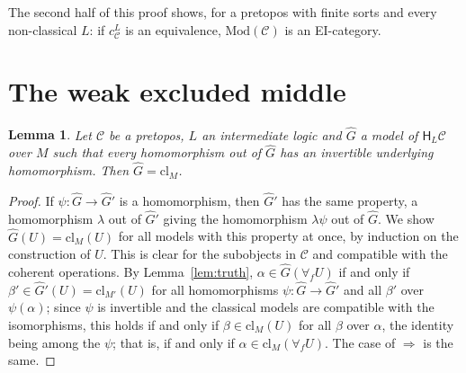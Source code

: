 \documentclass[11pt]{amsart}
\newtheorem{lem}[thm]{Lemma}
\theoremstyle{definition}
\newcommand{\Mod}{\mathrm{Mod}}
\newcommand{\HH}{\mathsf H}
\newcommand{\cC}{\mathcal C}
\newcommand{\cl}{\mathrm{cl}}
\begin{document}
The second half of this proof shows, for a pretopos with finite sorts
and every non-classical $L$: if $c^L_\cC$ is an equivalence,
$\Mod(\cC)$ is an EI-category.

\section{The weak excluded middle}

\begin{lem}\label{lem:classical}
Let $\cC$ be a pretopos, $L$ an intermediate logic and $\hat G$ a
model of $\HH_L\cC$ over $M$ such that every homomorphism out of
$\hat G$ has an invertible underlying homomorphism. Then $\hat G=
\cl_M$.
\end{lem}
\begin{proof}
If $\psi\colon\hat G\to\hat G'$ is a homomorphism, then $\hat G'$ has
the same property, a homomorphism $\lambda$ out of $\hat G'$ giving
the homomorphism $\lambda\psi$ out of $\hat G$. We show $\hat G(U)=
\cl_M(U)$ for all models with this property at once, by induction on
the construction of $U$. This is clear for the subobjects in $\cC$
and compatible with the coherent operations. By
Lemma~\ref{lem:truth}, $\alpha\in\hat G(\forall_fU)$ if and only if
$\beta'\in\hat G'(U)=\cl_{M'}(U)$ for all homomorphisms $\psi\colon
\hat G\to\hat G'$ and all $\beta'$ over $\psi(\alpha)$; since $\psi$
is invertible and the classical models are compatible with the
isomorphisms, this holds if and only if $\beta\in\cl_M(U)$ for all
$\beta$ over $\alpha$, the identity being among the $\psi$; that is,
if and only if $\alpha\in\cl_M(\forall_fU)$. The case of $\Rightarrow$
is the same.
\end{proof}
\end{document}
